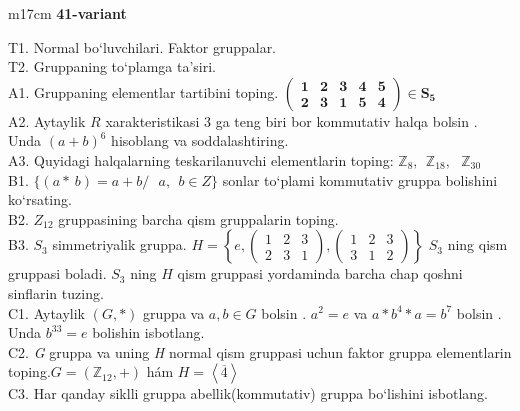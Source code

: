 \documentclass{article}
\begin{document}
\begin{tabular}{m{17cm}}
\textbf{41-variant}
\newline

T1. Normal bo`luvchilari. Faktor gruppalar. \\
T2. Gruppaning to`plamga ta'siri. \\
A1. Gruppaning elementlar tartibini toping. \(\begin{pmatrix}
\mathbf{1} & \mathbf{2} & \mathbf{3} & \mathbf{4} & \mathbf{5} \\
\mathbf{2} & \mathbf{3} & \mathbf{1} & \mathbf{5} & \mathbf{4}
\end{pmatrix}\mathbf{\in}\mathbf{S}_{\mathbf{5}}\) \\
A2. Aytaylik \(R\) xarakteristikasi 3 ga teng biri bor kommutativ halqa bo\textquotesingle lsin . Unda \((a + b)^{6}\) hisoblang va soddalashtiring. \\
A3. Quyidagi halqalarning teskarilanuvchi elementlarin toping: \(\mathbb{Z}_{8},\ \ \mathbb{Z}_{18},\ \ \ \mathbb{Z}_{30}\) \\
B1. \(\{(a*\ b) = a + b/\ \ \ a,\ \ b \in Z\}\) sonlar to`plami kommutativ gruppa bolishini ko`rsating. \\
B2. \(Z_{12}\) gruppasining barcha qism gruppalarin toping. \\
B3. \(S_{3}\) simmetriyalik gruppa. \(H = \left\{ e,\begin{pmatrix}
1 & 2 & 3 \\
2 & 3 & 1
\end{pmatrix},\begin{pmatrix}
1 & 2 & 3 \\
3 & 1 & 2
\end{pmatrix} \right\}\) \(S_{3}\) ning qism gruppasi bola\textquotesingle di. \(S_{3}\) ning \(H\) qism gruppasi yordaminda barcha chap qo\textquotesingle shni sinflarin tuzing. \\
C1. Aytaylik \((G,*)\) gruppa va \(a,b \in G\) bo\textquotesingle lsin . \(a^{2} = e\) va \(a*b^{4}*a = b^{7}\) bo\textquotesingle lsin . Unda \(b^{33} = e\) bolishin isbotlang. \\
C2. \emph{G} gruppa va uning \emph{H} normal qism gruppasi uchun faktor gruppa elementlarin toping.\(G = (\mathbb{Z}_{12}, + )\) hám \(H = \left\langle \overline{4} \right\rangle\) \\
C3. Har qanday siklli gruppa abellik(kommutativ) gruppa bo`lishini isbotlang. \\

\end{tabular}
\vspace{1cm}
\end{document}

